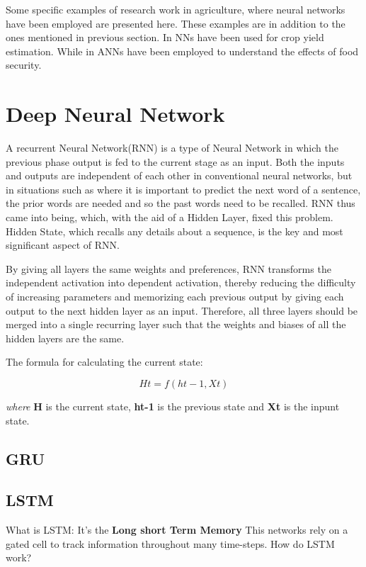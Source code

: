 Some specific examples of research work in agriculture, where neural networks have been employed are presented here. These examples are in addition to the ones mentioned in previous section. In \cite{ghielmi2006descriptive} NNs have been used for crop yield estimation. While in \cite{goyal2013artificial} ANNs have been employed to understand the effects of food security.  

\section{Deep Neural Network}

A recurrent Neural Network(RNN) is a type of Neural Network in which the previous phase output is fed to the current stage as an input. Both the inputs and outputs are independent of each other in conventional neural networks, but in situations such as where it is important to predict the next word of a sentence, the prior words are needed and so the past words need to be recalled. RNN thus came into being, which, with the aid of a Hidden Layer, fixed this problem. Hidden State, which recalls any details about a sequence, is the key and most significant aspect of RNN.\cite{jain1999recurrent}

By giving all layers the same weights and preferences, RNN transforms the independent activation into dependent activation, thereby reducing the difficulty of increasing parameters and memorizing each previous output by giving each output to the next hidden layer as an input.
Therefore, all three layers should be merged into a single recurring layer such that the weights and biases of all the hidden layers are the same.

The formula for calculating the current state:

\[Ht = f(ht-1, Xt)\]

\textit{where} \textbf{H} is the current state, \textbf{ht-1} is the previous state and \textbf{Xt} is the inpunt state.

\subsection{GRU}  %
\subsection{LSTM}
What is LSTM: It's the \textbf{Long short Term Memory} This networks rely on a gated cell to track information throughout many time-steps. How do LSTM work?


